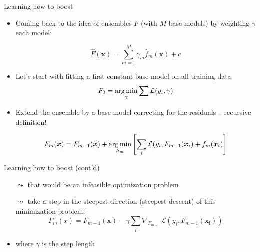 \documentclass[aspectratio=169]{../latex_main/tntbeamer}  %
\begin{document}
	\begin{frame}[c]{Learning how to boost}

    \vspace{-1em}
    \begin{itemize}
        \item Coming back to the idea of ensembles $F$ (with $M$ base models) by weighting $\gamma$ each model:
        
        $$ \hat{F}(\bm{x}) = \sum_{m=1}^{M} \gamma_m \hat{f}_m(\bm{x}) + c $$
        \item Let's start with fitting a first constant base model on all training data
        $$F_0 = \operatorname*{arg\,min}_{\gamma} \sum \mathcal{L}(y_i, \gamma) $$
        \item Extend the ensemble by a base model correcting for the residuals -- recursive definition!
        
        $$ F_m (\bm{x}) = F_{m-1}(\bm{x}) + \argmin_{h_m} \left[ \sum_i \mathcal{L}(y_i, F_{m-1}(\bm{x}_i) + f_m(\bm{x}_i) \right] $$
    \end{itemize}

	\end{frame}
	
	\begin{frame}[c]{Learning how to boost (cont'd)}

    \vspace{-1em}
    \begin{itemize}
        
        $$ F_m (\bm{x}) = F_{m-1}(\bm{x}) + \argmin_{h_m} \left[ \sum_i \mathcal{L}(y_i, F_{m-1}(\bm{x}_i) + f_m(\bm{x}_i) \right] $$
        \item[$\leadsto$] that would be an infeasible optimization problem
        \item[$\leadsto$] take a step in the steepest direction (steepest descent) of this minimization problem:
        $$ F_m(x) = F_{m-1}(\bm{x}) - \gamma \sum_i \nabla_{F_{m-1}} \mathcal{L}(y_i, F_{m-1}(\bm{x_i})) $$
        \item where $\gamma$ is the step length
    \end{itemize}

	\end{frame}
	
	
\end{document}
